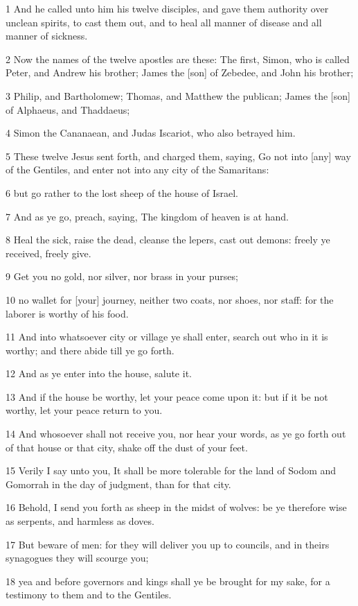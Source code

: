 \par 1 And he called unto him his twelve disciples, and gave them authority over unclean spirits, to cast them out, and to heal all manner of disease and all manner of sickness.
\par 2 Now the names of the twelve apostles are these: The first, Simon, who is called Peter, and Andrew his brother; James the [son] of Zebedee, and John his brother;
\par 3 Philip, and Bartholomew; Thomas, and Matthew the publican; James the [son] of Alphaeus, and Thaddaeus;
\par 4 Simon the Cananaean, and Judas Iscariot, who also betrayed him.
\par 5 These twelve Jesus sent forth, and charged them, saying, Go not into [any] way of the Gentiles, and enter not into any city of the Samaritans:
\par 6 but go rather to the lost sheep of the house of Israel.
\par 7 And as ye go, preach, saying, The kingdom of heaven is at hand.
\par 8 Heal the sick, raise the dead, cleanse the lepers, cast out demons: freely ye received, freely give.
\par 9 Get you no gold, nor silver, nor brass in your purses;
\par 10 no wallet for [your] journey, neither two coats, nor shoes, nor staff: for the laborer is worthy of his food.
\par 11 And into whatsoever city or village ye shall enter, search out who in it is worthy; and there abide till ye go forth.
\par 12 And as ye enter into the house, salute it.
\par 13 And if the house be worthy, let your peace come upon it: but if it be not worthy, let your peace return to you.
\par 14 And whosoever shall not receive you, nor hear your words, as ye go forth out of that house or that city, shake off the dust of your feet.
\par 15 Verily I say unto you, It shall be more tolerable for the land of Sodom and Gomorrah in the day of judgment, than for that city.
\par 16 Behold, I send you forth as sheep in the midst of wolves: be ye therefore wise as serpents, and harmless as doves.
\par 17 But beware of men: for they will deliver you up to councils, and in theirs synagogues they will scourge you;
\par 18 yea and before governors and kings shall ye be brought for my sake, for a testimony to them and to the Gentiles.

